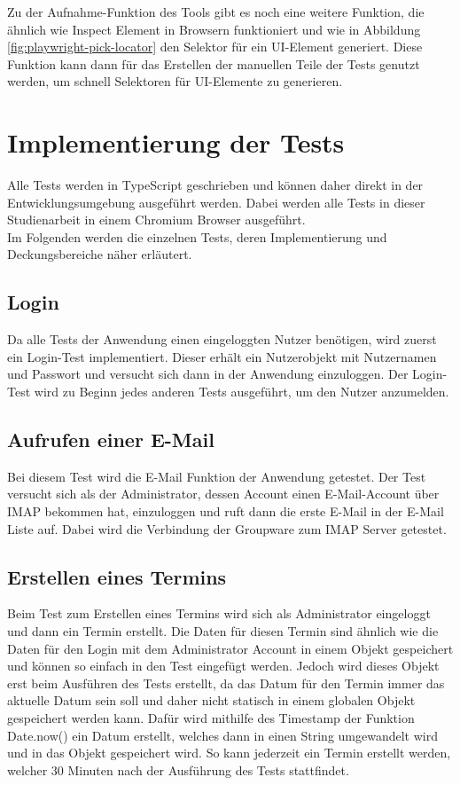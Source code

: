 Zu der Aufnahme-Funktion des Tools gibt es noch eine weitere Funktion, die ähnlich wie Inspect Element in Browsern funktioniert und wie in Abbildung \ref{fig:playwright-pick-locator} den Selektor für ein UI-Element generiert.
Diese Funktion kann dann für das Erstellen der manuellen Teile der Tests genutzt werden, um schnell Selektoren für UI-Elemente zu generieren.



\section{Implementierung der Tests}

Alle Tests werden in TypeScript geschrieben und können daher direkt in der Entwicklungsumgebung ausgeführt werden.
Dabei werden alle Tests in dieser Studienarbeit in einem Chromium Browser ausgeführt.
\\
Im Folgenden werden die einzelnen Tests, deren Implementierung und Deckungsbereiche näher erläutert.

\subsection{Login}

Da alle Tests der Anwendung einen eingeloggten Nutzer benötigen, wird zuerst ein Login-Test implementiert. Dieser erhält ein Nutzerobjekt mit Nutzernamen und Passwort und versucht sich dann in der Anwendung einzuloggen.
Der Login-Test wird zu Beginn jedes anderen Tests ausgeführt, um den Nutzer anzumelden.

\subsection{Aufrufen einer E-Mail}

Bei diesem Test wird die E-Mail Funktion der Anwendung getestet.
Der Test versucht sich als der Administrator, dessen Account einen E-Mail-Account über IMAP bekommen hat, einzuloggen und ruft dann die erste E-Mail in der E-Mail Liste auf.
Dabei wird die Verbindung der Groupware zum IMAP Server getestet.

\subsection{Erstellen eines Termins}

Beim Test zum Erstellen eines Termins wird sich als Administrator eingeloggt und dann ein Termin erstellt.
Die Daten für diesen Termin sind ähnlich wie die Daten für den Login mit dem Administrator Account in einem Objekt gespeichert und können so einfach in den Test eingefügt werden.
Jedoch wird dieses Objekt erst beim Ausführen des Tests erstellt, da das Datum für den Termin immer das aktuelle Datum sein soll und daher nicht statisch in einem globalen Objekt gespeichert werden kann.
Dafür wird mithilfe des Timestamp der Funktion Date.now() ein Datum erstellt, welches dann in einen String umgewandelt wird und in das Objekt gespeichert wird.
So kann jederzeit ein Termin erstellt werden, welcher 30 Minuten nach der Ausführung des Tests stattfindet.

